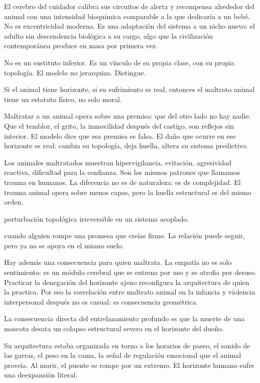 El cerebro del cuidador calibra sus circuitos de alerta y recompensa alrededor del animal con una intensidad bioquímica comparable a la que dedicaría a un bebé. No es excentricidad moderna. Es una adaptación del sistema a un nicho nuevo: el adulto sin descendencia biológica a su cargo, algo que la civilización contemporánea produce en masa por primera vez.

No es un sustituto inferior. Es un vínculo de su propia clase, con su propia topología. El modelo no jerarquiza. Distingue.

\noindent Si el animal tiene horizonte, si su sufrimiento es real, entonces el maltrato animal tiene un estatuto físico, no solo moral.

Maltratar a un animal opera sobre una premisa: que del otro lado no hay nadie. Que el temblor, el grito, la inmovilidad después del castigo, son reflejos sin interior. El modelo dice que esa premisa es falsa. El daño que ocurre en ese horizonte es real: cambia su topología, deja huella, altera su sistema predictivo.

Los animales maltratados muestran hipervigilancia, evitación, agresividad reactiva, dificultad para la confianza. Son los mismos patrones que llamamos trauma en humanos. La diferencia no es de naturaleza: es de complejidad. El trauma animal opera sobre menos capas, pero la huella estructural es del mismo orden.

\begin{fisica}
 perturbación topológica irreversible en un sistema acoplado.

 cuando alguien rompe una promesa que creías firme. La relación puede seguir, pero ya no se apoya en el mismo suelo.
\end{fisica}
Hay además una consecuencia para quien maltrata. La empatía no es solo sentimiento: es un módulo cerebral que se entrena por uso y se atrofia por desuso. Practicar la denegación del horizonte ajeno reconfigura la arquitectura de quien la practica. Por eso la correlación entre maltrato animal en la infancia y violencia interpersonal después no es casual: es consecuencia geométrica.

\noindent La consecuencia directa del entrelazamiento profundo es que la muerte de una mascota desata un colapso estructural severo en el horizonte del dueño.

Su arquitectura estaba organizada en torno a los horarios de paseo, el sonido de las garras, el peso en la cama, la señal de regulación emocional que el animal proveía. Al morir, el puente se rompe por un extremo. El horizonte humano sufre una deexpansión literal.

